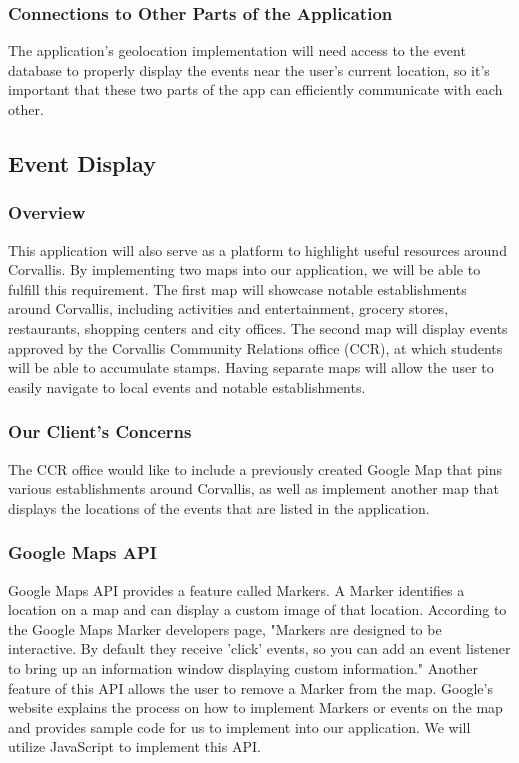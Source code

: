 \documentclass[draftclsnofoot, onecolumn, 10pt, compsoc]{IEEEtran}
\begin{document}
			\subsubsection{Connections to Other Parts of the Application}
				The application's geolocation implementation will need access to the event database to properly display the events near the user's current location, so it's important that these two parts of the app can efficiently communicate with each other.

		\subsection{Event Display}
			\subsubsection{Overview}
				This application will also serve as a platform to highlight useful resources around Corvallis. By implementing two maps into our application, we will be able to fulfill this requirement. The first map will showcase notable establishments around Corvallis, including activities and entertainment, grocery stores, restaurants, shopping centers and city offices. The second map will display events approved by the Corvallis Community Relations office (CCR), at which students will be able to accumulate stamps. Having separate maps will allow the user to easily navigate to local events and notable establishments.
			\subsubsection{Our Client's Concerns}
				The CCR office would like to include a previously created Google Map that pins various establishments around Corvallis, as well as implement another map that displays the locations of the events that are listed in the application.
			\subsubsection{Google Maps API}
				Google Maps API provides a feature called Markers. A Marker identifies a location on a map and can display a custom image of that location. According to the Google Maps Marker developers page, "Markers are designed to be interactive. By default they receive 'click' events, so you can add an event listener to bring up an information window displaying custom information." Another feature of this API allows the user to remove a Marker from the map. Google's website explains the process on how to implement Markers or events on the map and provides sample code for us to implement into our application. We will utilize JavaScript to implement this API.
				~\cite{GoogleMap}
\end{document}
